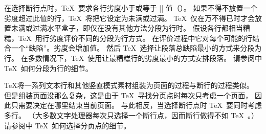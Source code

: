 \olist
\li 在选择断行点时，\TeX\ 要求各行劣度小于或等于 |\tolerance| 值（\xref \tolerance ）。
如果不得不放置一个劣度超过此值的行，\TeX\ 将把它设定为未满或过满。
\TeX\ 仅在万不得已时才会放置未满或过满水平盒子，即仅在没有其他方法分段为行时。
\li 假设各行都相当糟糕，\TeX\ 用行劣度评价不同的分段为行方式。
在评价过程中它对每个可能的行结合一个``缺陷''。劣度会增加值。
然后 \TeX\ 选择让段落总缺陷最小的方式来分段为行。
在多数情况下，\TeX\ 使用让最糟糕行的劣度最小的方式安排段落。
请参阅中 \TeX\ 如何分段为行的细节。
\endolist

\TeX 将一系列文本行和其他竖直模式素材组装为页面的过程与断行的过程类似。
但是组装页面没那么复杂，这是由于 \TeX\ 寻找分页点时每次只考虑一个页面，
因此只需要决定在哪里结束当前页面。
与此相反，当选择断行点时 \TeX\ 要同时考虑多行。%
（大多数文字处理器每次只选择一个断行点，因而断行做得不如 \TeX\ 。）%
请参阅中 \TeX\ 如何选择分页点的细节。
\endconcept


